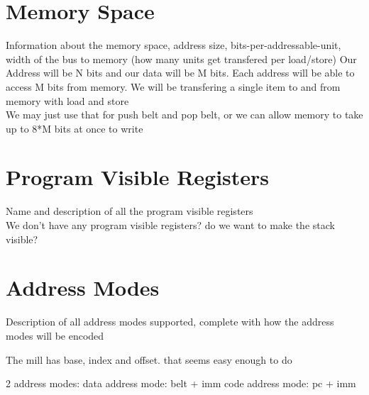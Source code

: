 \documentclass{article}
\begin{document}
\section{Memory Space}
Information about the memory space, address size, bits-per-addressable-unit, width of the bus to memory (how many units get transfered per load/store)
Our Address will be N bits and our data will be M bits.
Each address will be able to access M bits from memory.
We will be transfering a single item to and from memory with load and store\\
We may just use that for push belt and pop belt, or we can allow memory to take up to 8*M bits at once to write

\section{Program Visible Registers}
Name and description of all the program visible registers\\
We don't have any program visible registers? do we want to make the stack visible? 

\section{Address Modes}
Description of all address modes supported, complete with how the address modes will be encoded

The mill has base, index and offset. that seems easy enough to do

2 address modes:
    data address mode: belt + imm
    code address mode: pc + imm
\end{document}

